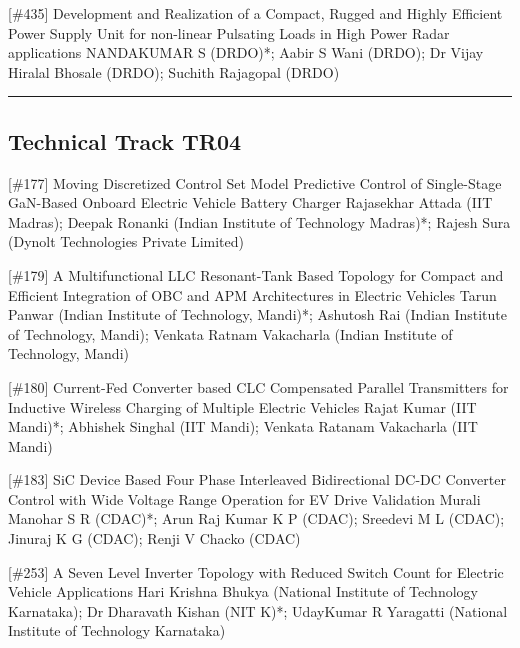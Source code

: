 {} \begin{abstract_online} {[\#435] Development and Realization of a Compact, Rugged and Highly Efficient Power Supply Unit for non-linear Pulsating Loads in High Power Radar applications} {} {NANDAKUMAR S (DRDO)*; Aabir  S Wani (DRDO); Dr Vijay Hiralal Bhosale (DRDO); Suchith Rajagopal (DRDO)} {}  \end{abstract_online} 
\hrule  \subsection{Technical Track TR04}\nopagebreak {} \begin{abstract_online} {[\#177] Moving Discretized Control Set Model Predictive Control of Single-Stage GaN-Based Onboard Electric Vehicle Battery Charger} {} {Rajasekhar Attada (IIT Madras); Deepak  Ronanki (Indian Institute of Technology Madras)*; Rajesh Sura (Dynolt Technologies Private Limited)} {}  \end{abstract_online} 
{} \begin{abstract_online} {[\#179] A Multifunctional LLC Resonant-Tank Based Topology for Compact and Efficient Integration of OBC and APM Architectures in Electric Vehicles} {} {Tarun Panwar (Indian Institute of Technology, Mandi)*; Ashutosh Rai (Indian Institute of Technology, Mandi); Venkata Ratnam Vakacharla (Indian Institute of Technology, Mandi)} {}  \end{abstract_online} 
{} \begin{abstract_online} {[\#180] Current-Fed Converter based CLC Compensated Parallel Transmitters for Inductive Wireless Charging of Multiple Electric Vehicles} {} {Rajat Kumar (IIT Mandi)*; Abhishek Singhal (IIT Mandi); Venkata Ratanam  Vakacharla (IIT Mandi)} {}  \end{abstract_online} 
{} \begin{abstract_online} {[\#183] SiC Device Based Four Phase Interleaved Bidirectional DC-DC Converter Control with Wide Voltage Range Operation for EV Drive Validation} {} {Murali Manohar S R (CDAC)*; Arun Raj Kumar K P (CDAC); Sreedevi M L (CDAC); Jinuraj K G (CDAC); Renji V Chacko (CDAC)} {}  \end{abstract_online} 
{} \begin{abstract_online} {[\#253] A Seven Level Inverter Topology with Reduced  Switch Count for Electric Vehicle Applications} {} {Hari Krishna Bhukya (National Institute of Technology Karnataka); Dr Dharavath  Kishan (NIT K)*; UdayKumar R Yaragatti (National Institute of Technology Karnataka)} {}  \end{abstract_online} 
